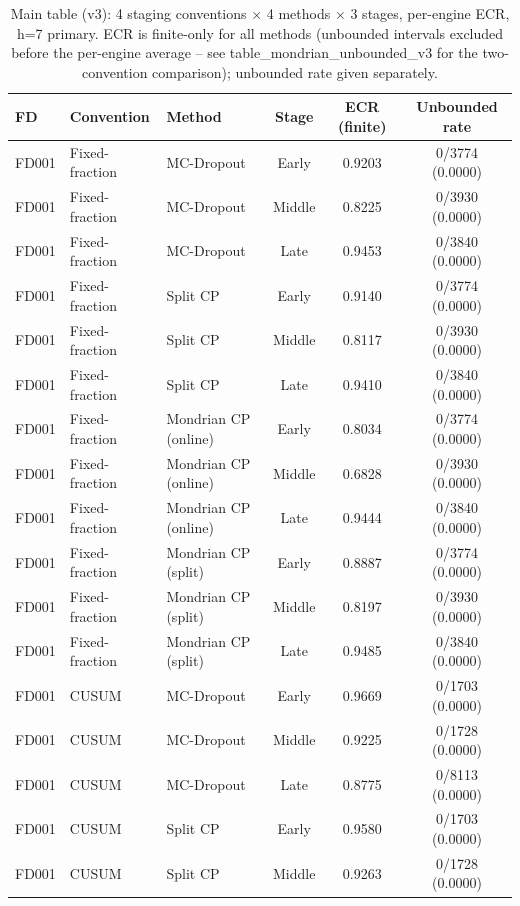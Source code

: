 \begin{table}[t]
\caption{Main table (v3): 4 staging conventions $\times$ 4 methods $\times$ 3 stages, per-engine ECR, h=7 primary. ECR is finite-only for all methods (unbounded intervals excluded before the per-engine average -- see table\_mondrian\_unbounded\_v3 for the two-convention comparison); unbounded rate given separately.}
\label{tab:main-v3}
\centering
\small
\begin{tabular}{lllccc}
\toprule
FD & Convention & Method & Stage & ECR (finite) & Unbounded rate \\
\midrule
FD001 & Fixed-fraction & MC-Dropout & Early & 0.9203 & 0/3774 (0.0000) \\
FD001 & Fixed-fraction & MC-Dropout & Middle & 0.8225 & 0/3930 (0.0000) \\
FD001 & Fixed-fraction & MC-Dropout & Late & 0.9453 & 0/3840 (0.0000) \\
FD001 & Fixed-fraction & Split CP & Early & 0.9140 & 0/3774 (0.0000) \\
FD001 & Fixed-fraction & Split CP & Middle & 0.8117 & 0/3930 (0.0000) \\
FD001 & Fixed-fraction & Split CP & Late & 0.9410 & 0/3840 (0.0000) \\
FD001 & Fixed-fraction & Mondrian CP (online) & Early & 0.8034 & 0/3774 (0.0000) \\
FD001 & Fixed-fraction & Mondrian CP (online) & Middle & 0.6828 & 0/3930 (0.0000) \\
FD001 & Fixed-fraction & Mondrian CP (online) & Late & 0.9444 & 0/3840 (0.0000) \\
FD001 & Fixed-fraction & Mondrian CP (split) & Early & 0.8887 & 0/3774 (0.0000) \\
FD001 & Fixed-fraction & Mondrian CP (split) & Middle & 0.8197 & 0/3930 (0.0000) \\
FD001 & Fixed-fraction & Mondrian CP (split) & Late & 0.9485 & 0/3840 (0.0000) \\
FD001 & CUSUM & MC-Dropout & Early & 0.9669 & 0/1703 (0.0000) \\
FD001 & CUSUM & MC-Dropout & Middle & 0.9225 & 0/1728 (0.0000) \\
FD001 & CUSUM & MC-Dropout & Late & 0.8775 & 0/8113 (0.0000) \\
FD001 & CUSUM & Split CP & Early & 0.9580 & 0/1703 (0.0000) \\
FD001 & CUSUM & Split CP & Middle & 0.9263 & 0/1728 (0.0000) \\

\end{tabular}
\end{table}
